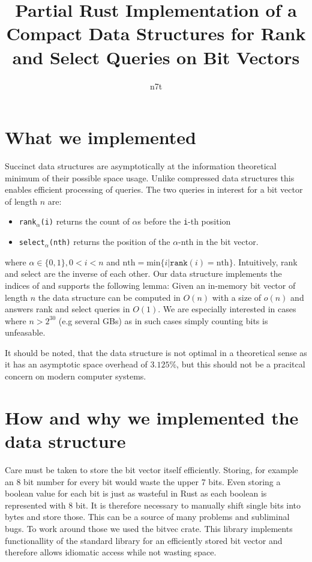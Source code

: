 \documentclass[a4paper,UKenglish,cleveref, autoref, thm-restate]{lipics-v2021}
\title{Partial Rust Implementation of a Compact Data Structures for Rank and Select Queries on Bit Vectors}
\author{n7t}{Karlsruhe Institute of Technology, Karlsruhe, Germany}{mail}{DOES NOT EXIST}{}
\begin{document}
\maketitle

\section{What we implemented}
\label{sec:What}
Succinct data structures are asymptotically at the information theoretical
minimum of their possible space usage. Unlike compressed data structures this
enables efficient processing of queries.
The two queries in interest for a bit vector of length $n$ are:
\begin{itemize}
 \item \texttt{rank$_\alpha$(i)} returns the count of $\alpha$s before
 the \texttt{i}-th position
 \item \texttt{select$_\alpha$(nth)} returns the position of the $\alpha$-nth
 in the bit vector.
\end{itemize}
where $\alpha \in \{0, 1\}, 0 < i < n$ and $\text{nth} = \text{min}\{i |
\texttt{rank}(i) = \text{nth}\}$.
Intuitively, rank and select are the inverse of each other.
Our data structure implements the indices of \cite{zhou2013space} and supports the
following lemma:
Given an in-memory bit vector of length $n$ the data structure
can be computed in $O(n)$ with a size
of $o(n)$ and answers rank and select queries in $O(1)$.
We are especially interested in cases where $n > 2^{30}$ (e.g several GBs)
as in such cases simply counting bits is unfeasable.

It should be noted, that the data structure is not optimal in a theoretical sense
as it has an asymptotic space overhead of $3.125\%$, but this
should not be a pracitcal concern on modern computer systems.


\section{How and why we implemented the data structure}
\label{sec:How and Why}
Care must be taken to store the bit vector itself efficiently. Storing, for example
an 8 bit number for every bit would waste the upper 7 bits. Even storing a boolean
value for each bit is just as wasteful in Rust as each boolean is represented
with 8 bit. It is therefore necessary to
manually shift single bits into bytes and store those. This can be a source of
many problems and subliminal bugs. To work around those we used the bitvec crate.
This library implements
functionallity of the standard library for an efficiently stored bit vector
and therefore allows idiomatic access while not wasting space.
\end{document}
